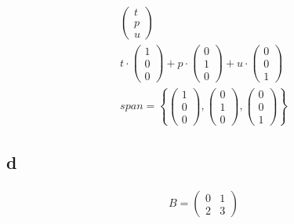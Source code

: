 \begin{align*}
    \begin{pmatrix}
        t \\ p \\ u
    \end{pmatrix}                                                         \\
    t \cdot \begin{pmatrix}
                1 \\ 0 \\ 0
            \end{pmatrix} + p \cdot \begin{pmatrix}
                                        0 \\ 1 \\ 0
                                    \end{pmatrix} + u \cdot \begin{pmatrix}
                                                                0 \\ 0 \\ 1
                                                            \end{pmatrix} \\
    span = \left\{\begin{pmatrix}
                      1 \\ 0 \\ 0
                  \end{pmatrix}, \begin{pmatrix}
                                     0 \\ 1 \\ 0
                                 \end{pmatrix}, \begin{pmatrix}
                                                    0 \\ 0 \\ 1
                                                \end{pmatrix}\right\}
\end{align*}

\subsection{d}

\begin{align*}
    B = \begin{pmatrix}
            0 & 1 \\
            2 & 3
        \end{pmatrix}
\end{align*}

